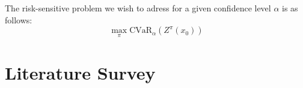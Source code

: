 The risk-sensitive problem we wish to adress for a given confidence level $\alpha$ is as follows:
\begin{equation}
\max_\pi \text{CVaR}_\alpha(Z^\pi(x_0))
\end{equation}




\section{Literature Survey}\label{sec:prelim:literature}


